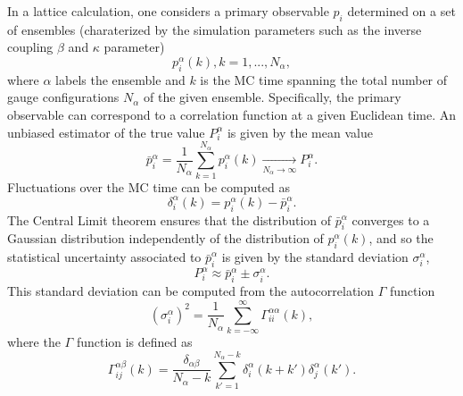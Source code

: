 In a lattice calculation, one considers a primary observable $p_i$ determined on a set of ensembles (charaterized by the simulation parameters such as the inverse coupling $\beta$ and $\kappa$ parameter) 
\begin{equation}
p_i^{\alpha}(k), k=1,...,N_{\alpha},
\end{equation}
where $\alpha$ labels the ensemble and $k$ is the MC time spanning the total number of gauge configurations $N_{\alpha}$ of the given ensemble. Specifically, the primary observable can correspond to  a correlation function at a given Euclidean time. An unbiased estimator of the true value $P_i^{\alpha}$ is given by the mean value
\begin{equation}
\bar{p}_i^{\alpha}=\frac{1}{N_{\alpha}}\sum_{k=1}^{N_{\alpha}}p_i^{\alpha}(k)\xrightarrow[N_{\alpha}\rightarrow\infty]{}P_i^{\alpha}.
\end{equation}
Fluctuations over the MC time can be computed as
\begin{equation}
\delta_i^{\alpha}(k)=p_i^{\alpha}(k)-\bar{p}_i^{\alpha}.
\end{equation}
The Central Limit theorem ensures that the distribution of $\bar{p}_i^{\alpha}$ converges to a Gaussian distribution independently of the distribution of $p_i^{\alpha}(k)$, and so the statistical uncertainty associated to $\bar{p}_i^{\alpha}$ is given by the standard deviation $\sigma_i^{\alpha}$,
\begin{equation}
P_i^{\alpha}\approx\bar{p}_i^{\alpha}\pm\sigma_i^{\alpha}.
\end{equation}
This standard deviation can be computed from the autocorrelation $\Gamma$ function
\begin{equation}
(\sigma_i^{\alpha})^2=\frac{1}{N_{\alpha}}\sum_{k=-\infty}^{\infty}\Gamma_{ii}^{\alpha\alpha}(k),
\end{equation}
where the $\Gamma$ function is defined as
\begin{equation}
\Gamma_{ij}^{\alpha\beta}(k)=\frac{\delta_{\alpha\beta}}{N_{\alpha}-k}\sum_{k'=1}^{N_{\alpha}-k}\delta_i^{\alpha}(k+k')\delta_j^{\alpha}(k').
\end{equation}

